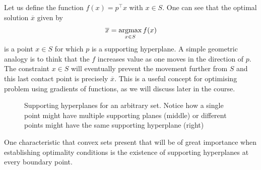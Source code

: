 Let us define the function $f(x) = p^\top x$ with $x \in S$. One can see that the optimal solution $\overline{x}$ given by 
%
\begin{align*}
	\overline{x} = \mathop{\rm argmax}_{x \in S} f(x)
\end{align*}
%
is a point $x \in S$ for which $p$ is a supporting hyperplane. A simple geometric analogy is to think that the $f$ increases value as one moves in the direction of $p$. The constraint $x \in S$ will eventually prevent the movement further from $S$ and this last contact point is precisely $\overline{x}$. This is a useful concept for optimising problem using gradients of functions, as we will discuss later in the course.

\begin{figure}[h]
	\caption{Supporting hyperplanes for an arbitrary set. Notice how a single point might have multiple supporting planes (middle) or different points might have the same supporting hyperplane (right)} \label{fig:support_hyperplane} 
\end{figure}

One characteristic that convex sets present that will be of great importance when establishing optimality conditions is the existence of supporting hyperplanes at every boundary point.

